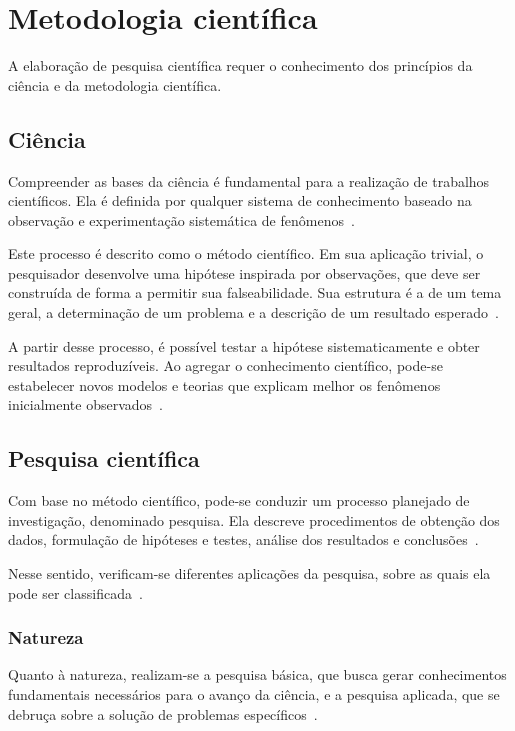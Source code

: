 \section{Metodologia científica}%
\label{sec:metodologia}

A elaboração de pesquisa científica requer o conhecimento dos princípios da ciência e da metodologia científica.

\subsection{Ciência}

Compreender as bases da ciência é fundamental para a realização de trabalhos científicos.
Ela é definida por qualquer sistema de conhecimento baseado na observação e experimentação sistemática de fenômenos~\cite{britannica_2024_science}.

Este processo é descrito como o método científico.
Em sua aplicação trivial, o pesquisador desenvolve uma hipótese inspirada por observações, que deve ser construída de forma a permitir sua falseabilidade.
Sua estrutura é a de um tema geral, a determinação de um problema e a descrição de um resultado esperado~\cite{liamara_pesquisa}.

A partir desse processo, é possível testar a hipótese sistematicamente e obter resultados reproduzíveis.
Ao agregar o conhecimento científico, pode-se estabelecer novos modelos e teorias que explicam melhor os fenômenos inicialmente observados~\cite{britannica_2024_scientific_method}.

\subsection{Pesquisa científica}

Com base no método científico, pode-se conduzir um processo planejado de investigação, denominado pesquisa.
Ela descreve procedimentos de obtenção dos dados, formulação de hipóteses e testes, análise dos resultados e conclusões~\cite{erol_2017_conduct}.

Nesse sentido, verificam-se diferentes aplicações da pesquisa, sobre as quais ela pode ser classificada~\cite{liamara_pesquisa,gil_2002_projetos}.

\subsubsection{Natureza}

Quanto à natureza, realizam-se a pesquisa básica, que busca gerar conhecimentos fundamentais necessários para o avanço da ciência, e a pesquisa aplicada, que se debruça sobre a solução de problemas específicos~\cite{liamara_pesquisa}.

